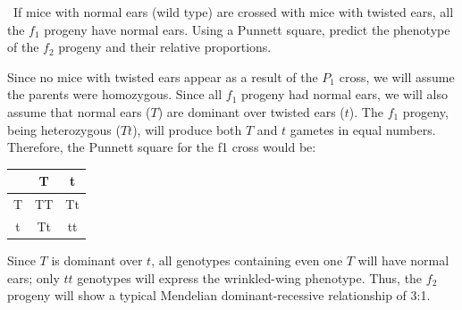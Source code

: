 \documentclass[exam,addpoints,noanswers]{exam}
\begin{document}
\begin{questions}
\clearpage
\question
{}

\clearpage
\question[23] If mice with normal ears (wild type) are crossed with mice with twisted ears, all the $f_1$ progeny have normal ears. Using a Punnett square, predict the phenotype of the $f_2$ progeny and their relative proportions.
\begin{solution}
Since no mice with twisted ears appear as a result of the $P_1$ cross, we will assume the parents were homozygous. Since all $f_1$ progeny had normal ears, we will also assume that normal ears ($T$) are dominant over twisted ears ($t$). The $f_1$ progeny, being heterozygous ($Tt$), will produce both $T$ and $t$ gametes in equal numbers. Therefore, the Punnett square for the f1 cross would be:
\begin{center}
\begin{tabular}{|c|c|c|}
\hline
& T & t \\
\hline
T & TT &Tt \\
\hline
t & Tt & tt \\
\hline
\end{tabular}
\end{center}
Since $T$ is dominant over $t$, all genotypes containing even one $T$ will have normal ears; only $tt$ genotypes will express the wrinkled-wing phenotype. Thus, the $f_2$ progeny will show a typical Mendelian dominant-recessive relationship of 3:1.
\end{solution}


\end{questions}
\end{document}
